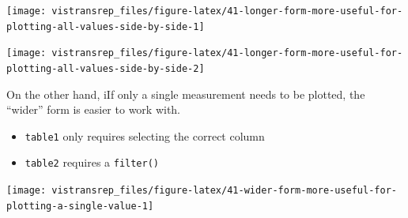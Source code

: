 \documentclass[]{book}
\newenvironment{Shaded}{}{}
\newcommand{\DataTypeTok}[1]{#1}
\newcommand{\KeywordTok}[1]{\textcolor[rgb]{0.00,0.00,1.00}{#1}}
\newcommand{\NormalTok}[1]{#1}
\newcommand{\OperatorTok}[1]{#1}
\newcommand{\StringTok}[1]{\textcolor[rgb]{0.00,0.50,0.50}{#1}}
\providecommand{\tightlist}{%
  \setlength{\itemsep}{0pt}\setlength{\parskip}{0pt}}
\begin{document}
\begin{flushright}\texttt{[image: vistransrep\_files/figure-latex/41-longer-form-more-useful-for-plotting-all-values-side-by-side-1]} \end{flushright}

\begin{Shaded}
\end{Shaded}

\begin{flushright}\texttt{[image: vistransrep\_files/figure-latex/41-longer-form-more-useful-for-plotting-all-values-side-by-side-2]} \end{flushright}

On the other hand, iIf only a single measurement needs to be plotted, the ``wider'' form is easier to work with.

\begin{itemize}
\tightlist
\item
  \texttt{table1} only requires selecting the correct column
\item
  \texttt{table2} requires a \texttt{filter()}
\end{itemize}

\begin{Shaded}
\end{Shaded}

\begin{flushright}\texttt{[image: vistransrep\_files/figure-latex/41-wider-form-more-useful-for-plotting-a-single-value-1]} \end{flushright}
\end{document}
